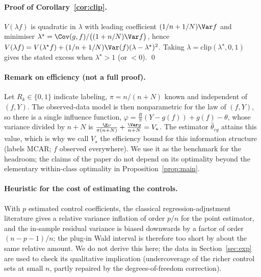 \paragraph{Proof of Corollary~\ref{cor:clip}.}
$V(\lambda f)$ is quadratic in $\lambda$ with leading coefficient $(1/n+1/N)\Var f$ and minimiser $\lambda^\star=\Cov(g,f)/\big((1+n/N)\Var f\big)$, hence $V(\lambda f)=V(\lambda^\star f)+(1/n+1/N)\Var(f)(\lambda-\lambda^\star)^2$. Taking $\lambda=\mathrm{clip}(\lambda^\star,0,1)$ gives the stated excess when $\lambda^\star>1$ (or $<0$). \qed

\paragraph{Remark on efficiency (not a full proof).}
Let $R_k\in\{0,1\}$ indicate labeling, $\pi=n/(n+N)$ known and independent of $(f,Y)$. The observed-data model is then nonparametric for the law of $(f,Y)$, so there is a single influence function, $\varphi=\frac{R}{\pi}(Y-g(f))+g(f)-\theta$, whose variance divided by $n+N$ is $\frac{\E v}{\pi(n+N)}+\frac{\Var g}{n+N}=V_\star$. The estimator $\hat\theta_{cg}$ attains this value, which is why we call $V_\star$ the efficiency bound for this information structure (labels MCAR; $f$ observed everywhere). We use it as the benchmark for the headroom; the claims of the paper do not depend on its optimality beyond the elementary within-class optimality in Proposition~\ref{prop:main}.

\paragraph{Heuristic for the cost of estimating the controls.}
With $p$ estimated control coefficients, the classical regression-adjustment literature gives a relative variance inflation of order $p/n$ for the point estimator, and the in-sample residual variance is biased downwards by a factor of order $(n-p-1)/n$; the plug-in Wald interval is therefore too short by about the same relative amount. We do not derive this here; the data in Section~\ref{sec:exp} are used to check its qualitative implication (undercoverage of the richer control sets at small $n$, partly repaired by the degrees-of-freedom correction).
